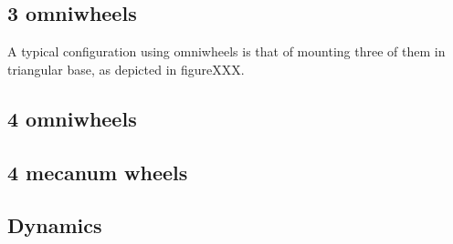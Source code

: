 \subsection{3 omniwheels}
A typical configuration using omniwheels is that of mounting three of them in triangular base, as depicted in figureXXX.



\subsection{4 omniwheels}

\subsection{4 mecanum wheels}


\subsection{Dynamics}


